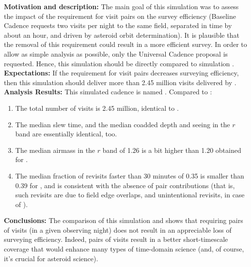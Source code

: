 {\bf Motivation and description:} The main goal of this simulation was
to assess the impact of the requirement for visit pairs on the survey
efficiency (Baseline Cadence requests two visits per night to the same
field, separated in time by about an hour, and driven by asteroid
orbit determination). It is plausible that the removal of this
requirement could result in a more efficient survey. In order to allow
as simple analysis as possible, only the Universal Cadence proposal is
requested. Hence, this simulation should be directly compared to
simulation . \\

{\bf Expectations:} If the requirement for visit pairs decreases
surveying efficiency, then this simulation should deliver more than
2.45 million visits delivered by . \\

{\bf Analysis Results:} This simulated cadence is named . Compared
to :
\begin{enumerate}
\item The total number of visits is 2.45 million, identical to .
\item The median slew time, and the median coadded depth and seeing in the $r$ band
are essentially identical, too.
\item The median airmass in the $r$ band of 1.26 is a bit higher than 1.20 obtained
for .
\item The median fraction of revisits faster than 30 minutes of 0.35 is smaller than 0.39
for , and is consistent with the absence of pair contributions (that is,
such revisits are due to field edge overlaps, and unintentional revisits, in case of ).
\end{enumerate}

{\bf Conclusions:} The comparison of this simulation and
 shows that requiring pairs of visits (in a
given observing night) does not result in an appreciable loss of
surveying efficiency. Indeed, pairs of visits result in a better
short-timescale coverage that would enhance many types of time-domain
science (and, of course, it's crucial for asteroid science).





